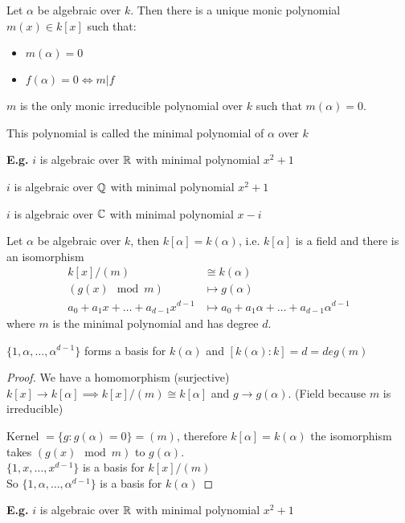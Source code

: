 \documentclass[11pt]{article}
\begin{document}
\begin{prop}
	Let $\alpha$ be algebraic over $k$.
	Then there is a unique monic polynomial $m(x) \in k[x]$ such that:
	\begin{itemize}
		\item{$m(\alpha) = 0 $}
		\item{$f(\alpha) = 0 \iff m | f$}
	\end{itemize}
\end{prop}

$m$ is the only monic irreducible polynomial over $k$ such that $m(\alpha) = 0$.


\begin{defn}
This polynomial is called the minimal polynomial of $\alpha$ over $k$
\end{defn}
$ $\\[-0.5em]
\textbf{E.g.} $i$ is algebraic over $\mathbb{R}$ with minimal polynomial $x^2 + 1$

$i$ is algebraic over $\mathbb{Q}$ with minimal polynomial $x^2 + 1$

$i $ is algebraic over $\mathbb{C}$ with minimal polynomial $x-i$


\begin{cor}
	Let $\alpha$ be algebraic over $k$, then $k[\alpha] = k(\alpha)$, i.e. $k[\alpha]$ is a field and there is an isomorphism 
	\begin{align*}
		k[x]/ (m) &\cong k(\alpha)\\
		(g(x) \mod m) &\mapsto g(\alpha)\\
		a_0+a_1x +\dots + a_{d-1}x^{d-1} &\mapsto a_0 + a_1\alpha + \dots +a_{d-1}\alpha^{d-1} 
	\end{align*}
	where $m$ is the minimal polynomial and has degree $d$.
\end{cor}

$\{ 1, \alpha, \dots, \alpha^{d-1} \}$ forms a basis for $k(\alpha)$ and $[k(\alpha) : k] = d = deg(m)$




\begin{proof}
	We have a homomorphism (surjective) $k[x] \to k[\alpha] \implies k[x] / (m) \cong k[\alpha]$ and $g \to g(\alpha) $.
	(Field because $m$ is irreducible)

	Kernel $= \{ g: g(\alpha) = 0 \} = (m)$, therefore $k[\alpha]= k(\alpha) $ the isomorphism takes $(g(x) \mod m)$ to $g(\alpha)$.
	$ $\\[1em]
	 $ \{ 1,x,\dots, x^{d-1} \}$ is a basis for $k[x]/(m) $
	 $ $\\[1em]
	 So $ \{ 1,\alpha, \dots, \alpha^{d-1} \}$ is a basis for $k(\alpha)$
\end{proof}
$ $\\[-0.5em]
\textbf{E.g.} $i$ is algebraic over $\mathbb{R}$ with minimal polynomial $x^2 + 1$
\end{document}
